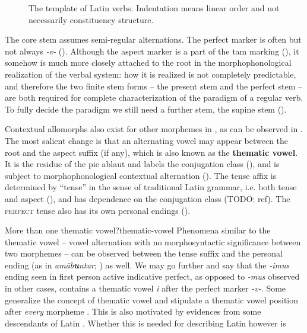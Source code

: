 \documentclass[a4paper, oneside]{report}
\newcommand*{\citepage}[1]{p.~{#1}}
\newcommand*{\concept}[1]{\textbf{#1}}
\newcommand{\form}[1]{\emph{#1}}
\newcommand*{\category}[1]{\textsc{#1}}
\begin{document}
\begin{figure}[H]
    \centering
    
    \caption{The template of Latin verbs.
    Indentation means linear order and not necessarily constituency structure.}
    \label{fig:latin-verb}
\end{figure}

The core stem assumes semi-regular alternations.
The perfect marker is often but not always \form{-v-} ().
Although the aspect marker is a part of the \acs{tam} marking
(),
it somehow is much more closely attached to the root 
in the morphophonological realization of the verbal system:
how it is realized is not completely predictable,
and therefore the two finite stem forms -- 
the present stem and the perfect stem -- 
are both required for complete characterization of the paradigm of a regular verb.
To fully decide the paradigm 
we still need a further stem, the supine stem
().

Contextual allomorphs also exist for other morphemes in 
\citep[\citepage{11}]{embick2005status},
as can be observed in .
The most salient change is that 
an alternating vowel may appear between the root and the aspect suffix (if any),
which is also known as the \concept{thematic vowel}.
It is the residue of the \ac{pie} ablaut
and labels the conjugation class
(),
and is subject to morphophonological contextual alternation
().
The tense affix is determined by ``tense'' in the sense of traditional Latin grammar, 
i.e. both tense and aspect (),
and has dependence on the conjugation class (TODO: ref).
The \category{perfect} tense also has its own personal endings ().

\begin{infobox}{More than one thematic vowel?}{thematic-vowel}
    Phenomena similar to the thematic vowel -- vowel alternation with no morphosyntactic significance 
    between two morphemes -- can be observed 
    between the tense suffix and the personal ending 
    (as in \form{am\={a}b\textbf{u}ntur}; ) as well.
    We may go further and say that
    the \form{-imus} ending seen in first person active indicative perfect,
    as opposed to \form{-mus} observed in other cases, 
    contains a thematic vowel \form{i} after the perfect marker \form{-v-}.
    Some generalize the concept of thematic vowel and 
    stipulate a thematic vowel position after \emph{every} morpheme
    \cite{embick2003latin}.
    This is also motivated by evidences from some descendants of Latin 
    \citep{oltra1999notion,oltra2005stress}.
    Whether this is needed for describing Latin however is 
\end{infobox}
\end{document}
